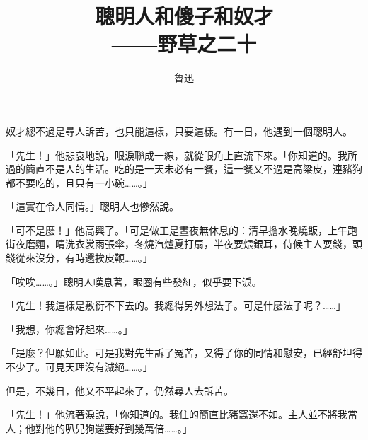 \documentclass[a5j,12pt]{ltjtarticle}
\title{\gtfamily 聰明人和傻子和奴才 \\[1em]
\hfil\normalsize\mcfamily ——野草之二十\hspace*{-3\zw}}
\author{\small\kai 魯迅}
\date{}
\begin{document}
\maketitle

奴才總不過是尋人訴苦，也只能這樣，只要這樣。有一日，他遇到一個聰明人。

「先生！」他悲哀地說，眼淚聯成一線，就從眼角上直流下來。「你知道的。我所過的簡直不是人的生活。吃的是一天未必有一餐，這一餐又不過是高粱皮，連豬狗都不要吃的，且只有一小碗……。」

「這實在令人同情。」聰明人也慘然說。

「可不是麼！」他高興了。「可是做工是晝夜無休息的：清早擔水晚燒飯，上午跑街夜磨麵，晴洗衣裳雨張傘，冬燒汽爐夏打扇，半夜要煨銀耳，侍候主人耍錢，頭錢從來沒分，有時還挨皮鞭……。」

「唉唉……。」聰明人嘆息著，眼圈有些發紅，似乎要下淚。

「先生！我這樣是敷衍不下去的。我總得另外想法子。可是什麼法子呢？……」

「我想，你總會好起來……。」

「是麼？但願如此。可是我對先生訴了冤苦，又得了你的同情和慰安，已經舒坦得不少了。可見天理沒有滅絕……。」

\bigskip

但是，不幾日，他又不平起來了，仍然尋人去訴苦。

「先生！」他流著淚說，「你知道的。我住的簡直比豬窩還不如。主人並不將我當人；他對他的叭兒狗還要好到幾萬倍……。」
\end{document}
